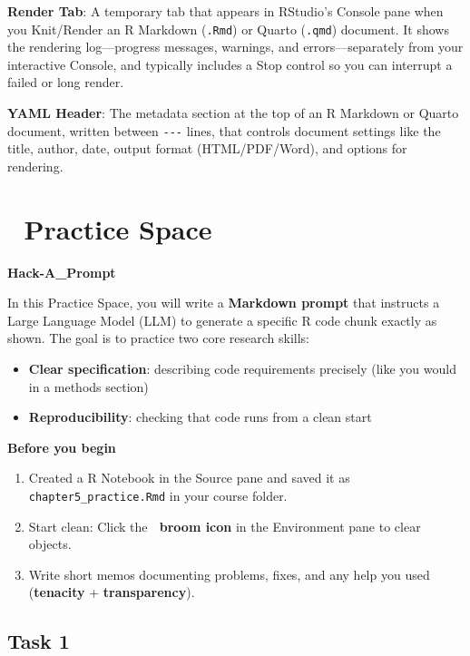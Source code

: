 \documentclass[
  12pt,
]{scrreprt}
\begin{document}
\textbf{Render Tab}: A temporary tab that appears in RStudio's Console
pane when you Knit/Render an R Markdown (\texttt{.Rmd}) or Quarto
(\texttt{.qmd}) document. It shows the rendering log---progress
messages, warnings, and errors---separately from your interactive
Console, and typically includes a Stop control so you can interrupt a
failed or long render.

\textbf{YAML Header}: The metadata section at the top of an R Markdown
or Quarto document, written between \texttt{-\/-\/-} lines, that
controls document settings like the title, author, date, output format
(HTML/PDF/Word), and options for rendering.

\chapter{📝 Practice Space}\label{practice-space}

\textbf{Hack-A\_Prompt}

In this Practice Space, you will write a \textbf{Markdown prompt} that
instructs a Large Language Model (LLM) to generate a specific R code
chunk exactly as shown. The goal is to practice two core research
skills:

\begin{itemize}
\item
  \textbf{Clear specification}: describing code requirements precisely
  (like you would in a methods section)
\item
  \textbf{Reproducibility}: checking that code runs from a clean start
\end{itemize}

\textbf{Before you begin}

\begin{enumerate}
\def\labelenumi{\arabic{enumi}.}
\item
  Created a R Notebook in the Source pane and saved it as
  \texttt{chapter5\_practice.Rmd} in your course folder.
\item
  Start clean: Click the 🧹 \textbf{broom icon} in the Environment pane
  to clear objects.
\item
  Write short memos documenting problems, fixes, and any help you used
  (\textbf{tenacity} + \textbf{transparency}).
\end{enumerate}

\section{Task 1}\label{task-1}
\end{document}
